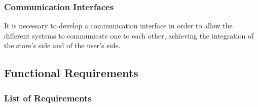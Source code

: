 \documentclass{article}
\begin{document}
		\subsubsection{Communication Interfaces}
		
			It is necessary to develop a communication interface in order to allow the different systems to communicate one to each other, achieving the integration of the store’s side and of the user’s side.
	\newpage
	\subsection{Functional Requirements}
	
		\subsubsection{List of Requirements}
		
\end{document}
